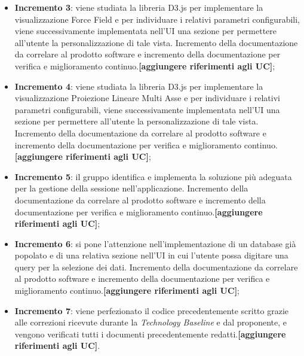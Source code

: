 \begin{itemize}
\begin{itemize}
	\item \textbf{Incremento 3}: viene studiata la libreria D3.js per implementare la visualizzazione Force Field e per individuare i relativi parametri configurabili, viene successivamente implementata nell'UI una sezione per permettere all'utente la personalizzazione di tale vista. Incremento della documentazione da correlare al prodotto software e incremento della documentazione per verifica e miglioramento continuo.\textbf{[aggiungere riferimenti agli UC]};
	
	\item \textbf{Incremento 4}: viene studiata la libreria D3.js per implementare la visualizzazione Proiezione Lineare Multi Asse e per individuare i relativi parametri configurabili, viene successivamente implementata nell'UI una sezione per permettere all'utente la personalizzazione di tale vista. Incremento della documentazione da correlare al prodotto software e incremento della documentazione per verifica e miglioramento continuo.\textbf{[aggiungere riferimenti agli UC]};
	
	\item \textbf{Incremento 5}: il gruppo identifica e implementa la soluzione più adeguata per la gestione della sessione nell'applicazione. Incremento della documentazione da correlare al prodotto software e incremento della documentazione per verifica e miglioramento continuo.\textbf{[aggiungere riferimenti agli UC]};
	
	\item \textbf{Incremento 6}: si pone l'attenzione nell'implementazione di un database già popolato e di una relativa sezione nell'UI in cui l'utente possa digitare una query per la selezione dei dati. Incremento della documentazione da correlare al prodotto software e incremento della documentazione per verifica e miglioramento continuo.\textbf{[aggiungere riferimenti agli UC]};
	
	\item \textbf{Incremento 7}: viene perfezionato il codice precedentemente scritto grazie alle correzioni ricevute durante la \textit{Technology Baseline} e dal proponente, e vengono verificati tutti i documenti precedentemente redatti.\textbf{[aggiungere riferimenti agli UC]}.
	\end{itemize}
\end{itemize}

